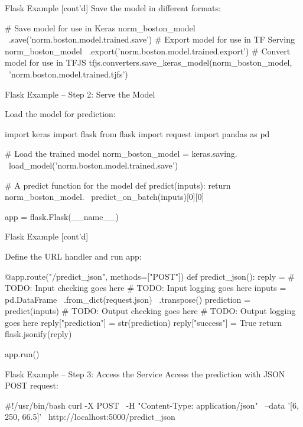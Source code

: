 \documentclass[ignorenonframetext,xcolor=x11names]{beamer}
\begin{document}
\begin{frame}[label=withcode,fragile]{Flask Example \small [cont'd]}
Save the model in different formats:
\begin{pythoncode}
# Save model for use in Keras
norm_boston_model \
    .save('norm.boston.model.trained.save')
# Export model for use in TF Serving
norm_boston_model \
    .export('norm.boston.model.trained.export')
# Convert model for use in TFJS
tfjs.converters.save_keras_model(norm_boston_model, \
    'norm.boston.model.trained.tjfs')
\end{pythoncode}
\end{frame}

\begin{frame}[label=withcode,fragile]{Flask Example -- Step 2: Serve the Model}

Load the model for prediction:
\begin{pythoncode}
import keras
import flask
from flask import request
import pandas as pd

# Load the trained model
norm_boston_model = keras.saving. \
    load_model('norm.boston.model.trained.save')

# A predict function for the model
def predict(inputs):
    return norm_boston_model. \
        predict_on_batch(inputs)[0][0]

app = flask.Flask(__name__)
\end{pythoncode}
\end{frame}

\begin{frame}[label=withcode,fragile]{Flask Example \small [cont'd]}

Define the URL handler and run app:
\begin{pythoncode}
@app.route("/predict_json", methods=["POST"])
def predict_json():
    reply = {}
    # TODO: Input checking goes here
    # TODO: Input logging goes here
    inputs = pd.DataFrame \
               .from_dict(request.json) \
               .transpose()
    prediction = predict(inputs)
    # TODO: Output checking goes here
    # TODO: Output logging goes here
    reply["prediction"] = str(prediction)
    reply["success"] = True
    return flask.jsonify(reply)
    
app.run()
\end{pythoncode}
\end{frame}

\begin{frame}[label=withcode,fragile]{Flask Example -- Step 3: Access the Service}
Access the prediction with JSON POST request:
\begin{bashcode}
#!/usr/bin/bash
curl -X POST \
     -H "Content-Type: application/json" \
     --data '[6, 250, 66.5]' \
     http://localhost:5000/predict_json
\end{bashcode}
\end{frame}
\end{document}
